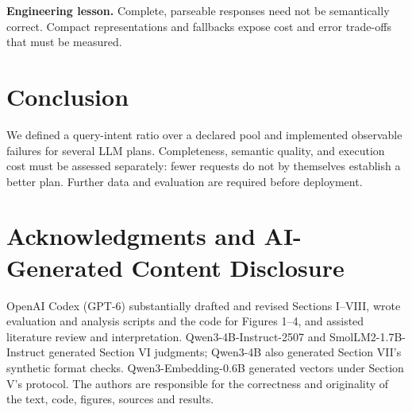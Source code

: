 \documentclass[conference]{IEEEtran}
\begin{document}
\textbf{Engineering lesson.} Complete, parseable responses need not be semantically correct. Compact representations and fallbacks expose cost and error trade-offs that must be measured.

\section{Conclusion}
We defined a query-intent ratio over a declared pool and implemented observable failures for several LLM plans. Completeness, semantic quality, and execution cost must be assessed separately: fewer requests do not by themselves establish a better plan. Further data and evaluation are required before deployment.

\section*{Acknowledgments and AI-Generated Content Disclosure}
OpenAI Codex (GPT-6) substantially drafted and revised Sections I--VIII, wrote evaluation and analysis scripts and the code for Figures 1--4, and assisted literature review and interpretation. Qwen3-4B-Instruct-2507 and SmolLM2-1.7B-Instruct generated Section VI judgments; Qwen3-4B also generated Section VII's synthetic format checks. Qwen3-Embedding-0.6B generated vectors under Section V's protocol. The authors are responsible for the correctness and originality of the text, code, figures, sources and results.
\end{document}
